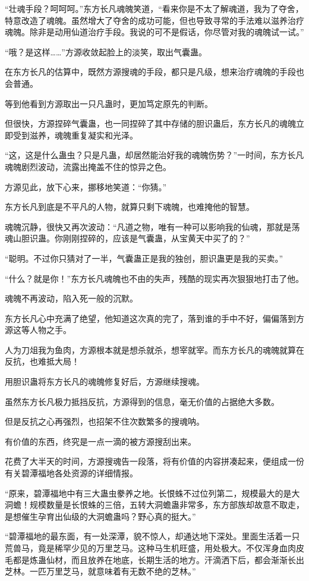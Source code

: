 \begin{this_body}
“壮魂手段？呵呵呵。”东方长凡魂魄笑道，“看来你是不太了解魂道，我为了夺舍，特意改造了魂魄。虽然增大了夺舍的成功可能，但也导致寻常的手法难以滋养治疗魂魄。除非是动用仙道治疗手段。我说的可不是假话，你尽管对我的魂魄试一试。”

“哦？是这样……”方源收敛起脸上的淡笑，取出气囊蛊。

在东方长凡的估算中，既然方源搜魂的手段，都只是凡级，想来治疗魂魄的手段也会普通。

等到他看到方源取出一只凡蛊时，更加笃定原先的判断。

但很快，方源捏碎气囊蛊，也一同捏碎了其中存储的胆识蛊后，东方长凡的魂魄立即受到滋养，魂魄重复凝实和光泽。

“这，这是什么蛊虫？只是凡蛊，却居然能治好我的魂魄伤势？”一时间，东方长凡魂魄剧烈波动，流露出掩盖不住的惊异之色。

方源见此，放下心来，挪移地笑道：“你猜。”

东方长凡到底是不平凡的人物，就算只剩下魂魄，也难掩他的智慧。

魂魄沉静，很快又再次波动：“凡道之物，唯有一种可以影响我的仙魂，那就是荡魂山胆识蛊。你刚刚捏碎的，应该是气囊蛊，从宝黄天中买了的？”

“聪明。不过你只猜对了一半，气囊蛊正是我的独创，胆识蛊更是我的买卖。”

“什么？就是你！”东方长凡魂魄也不由的失声，残酷的现实再次狠狠地打击了他。

魂魄不再波动，陷入死一般的沉默。

东方长凡心中充满了绝望，他知道这次真的完了，落到谁的手中不好，偏偏落到方源这等人物之手。

人为刀俎我为鱼肉，方源根本就是想杀就杀，想宰就宰。而东方长凡的魂魄就算在反抗，也难抵大局！

用胆识蛊将东方长凡的魂魄修复好后，方源继续搜魂。

虽然东方长凡极力抵挡反抗，方源得到的信息，毫无价值的占据绝大多数。

但是反抗之心再强烈，也招架不住次数繁多的搜魂呐。

有价值的东西，终究是一点一滴的被方源搜刮出来。

花费了大半天的时间，方源搜魂告一段落，将有价值的内容拼凑起来，便组成一份有关碧潭福地各处资源的详细情报。

“原来，碧潭福地中有三大蛊虫豢养之地。长恨蛛不过位列第二，规模最大的是大洞蟾！规模数量是长恨蛛的三倍，五转大洞蟾蛊非常多，东方部族却故意不取走，是想催生孕育出仙级的大洞蟾蛊吗？野心真的挺大。”

“碧潭福地的最东面，有一处深潭，貌不惊人，却通达地下深处。里面生活着一只荒兽马，竟是稀罕少见的万里芝马。这种马生机旺盛，用处极大。不仅浑身血肉皮毛都是炼蛊仙材，而且放养在地底，长期生活的地方。汗滴洒下后，都会渐渐长出芝林。一匹万里芝马，就意味着有无数不绝的芝林。”


\end{this_body}
